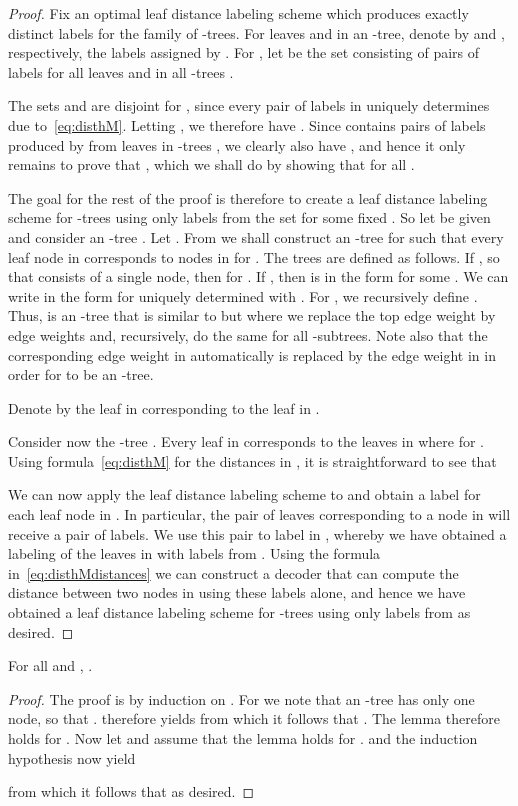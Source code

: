 \begin{proof}
Fix an optimal leaf distance labeling scheme  which produces exactly  distinct labels for the family of -trees. For leaves  and  in an -tree, denote by  and , respectively, the labels assigned by . For , let  be the set consisting of pairs of labels  for all leaves  and  in all -trees .

The sets  and  are disjoint for , since every pair of labels in  uniquely determines  due to~\eqref{eq:disthM}. Letting , we therefore have . 
Since  contains pairs of labels produced by  from leaves in -trees , we clearly also have , and hence it only remains to prove that , which we shall do by showing that  for all .

The goal for the rest of the proof is therefore to create a leaf distance labeling scheme for -trees using only labels from the set  for some fixed . So let  be given and consider an -tree . Let  . From  we shall construct an -tree  for  such that every leaf node  in  corresponds to nodes  in  for .
The trees  are defined as follows.
If , so that  consists of a single node, then  for . 
If , then  is in the form  for some . We can write  in the form  for uniquely determined  with . For , we recursively define . Thus,  is an -tree that is similar to  but where we replace the top edge weight  by edge weights  and, recursively, do the same for all -subtrees. Note also that the corresponding edge weight  in  automatically is replaced by the edge weight  in  in order for  to be an -tree.

Denote by  the leaf in  corresponding to the leaf  in .

Consider now the -tree . Every leaf  in  corresponds to the leaves  in  where  for . 
Using  formula~\eqref{eq:disthM} for the distances in , it is straightforward to see that


We can now apply the leaf distance labeling scheme  to  and obtain a label for each leaf node in . In particular, the pair of leaves  corresponding to a node  in  will receive a pair of labels. We use this pair to label  in , whereby we have obtained a labeling of the leaves in  with labels from . Using the formula in~\eqref{eq:disthMdistances} we can construct a decoder that can compute the distance between two nodes in  using these labels alone, and hence we have obtained a leaf distance labeling scheme for -trees using only labels from  as desired.
\end{proof}

\begin{lemma} \label{lemm:distancehM2}
For all  and , .
\end{lemma}
\begin{proof}
The proof is by induction on . For  we note that an -tree has only one node, so that .  therefore yields  from which it follows that . The lemma therefore holds for . Now let  and assume that the lemma holds for .  and the induction hypothesis now yield

from which it follows that  as desired.
\end{proof}

